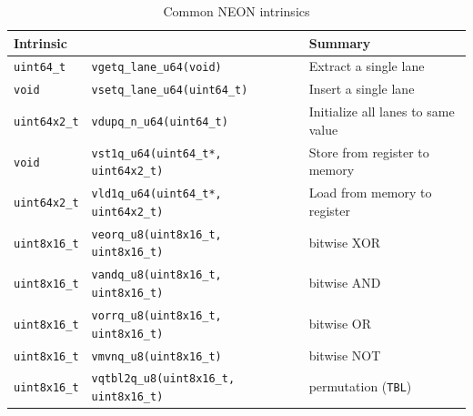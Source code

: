 \begin{table}[h!]
    \centering
    \footnotesize
    \caption{Common NEON intrinsics}
    \begin{tabularx}{\textwidth}{llX}
        \toprule
        Intrinsic && Summary \\
        \midrule
        \texttt{uint64\_t} & \texttt{vgetq\_lane\_u64(void)} & Extract a single lane \\
        \midrule
        \texttt{void} & \texttt{vsetq\_lane\_u64(uint64\_t)} & Insert a single lane \\
        \midrule
        \texttt{uint64x2\_t} & \texttt{vdupq\_n\_u64(uint64\_t)} & Initialize all lanes to same value \\
        \midrule
        \texttt{void} & \texttt{vst1q\_u64(uint64\_t*, uint64x2\_t)} & Store from register to memory \\
        \midrule
        \texttt{uint64x2\_t} & \texttt{vld1q\_u64(uint64\_t*, uint64x2\_t)} & Load from memory to register \\
        \midrule
        \texttt{uint8x16\_t} & \texttt{veorq\_u8(uint8x16\_t, uint8x16\_t)} & bitwise XOR \\
        \midrule
        \texttt{uint8x16\_t} & \texttt{vandq\_u8(uint8x16\_t, uint8x16\_t)} & bitwise AND \\
        \midrule
        \texttt{uint8x16\_t} & \texttt{vorrq\_u8(uint8x16\_t, uint8x16\_t)} & bitwise OR \\
        \midrule
        \texttt{uint8x16\_t} & \texttt{vmvnq\_u8(uint8x16\_t)} & bitwise NOT \\
        \midrule
        \texttt{uint8x16\_t} & \texttt{vqtbl2q\_u8(uint8x16\_t, uint8x16\_t)} & permutation (\texttt{TBL}) \\
        \bottomrule
    \end{tabularx}
\end{table}
